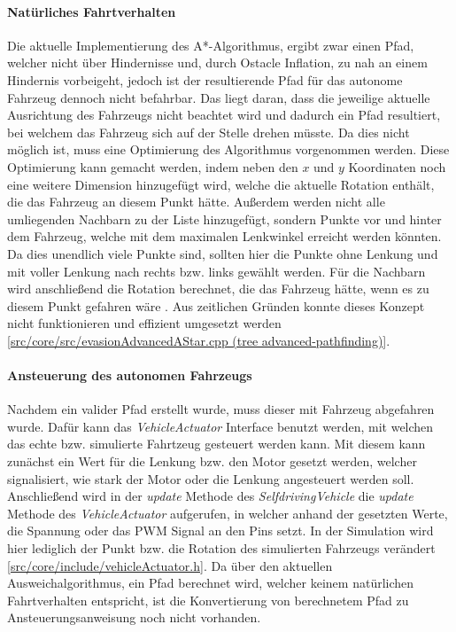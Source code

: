 \paragraph{Natürliches Fahrtverhalten} \mbox{}

Die aktuelle Implementierung des A*-Algorithmus, ergibt zwar einen Pfad, welcher nicht über Hindernisse und, durch Ostacle Inflation, 
zu nah an einem Hindernis vorbeigeht, jedoch ist der resultierende Pfad für das autonome Fahrzeug dennoch nicht befahrbar. 
Das liegt daran, dass die jeweilige aktuelle Ausrichtung des Fahrzeugs nicht beachtet wird und dadurch ein Pfad resultiert, 
bei welchem das Fahrzeug sich auf der Stelle drehen müsste. 
Da dies nicht möglich ist, muss eine Optimierung des Algorithmus vorgenommen werden. 
Diese Optimierung kann gemacht werden, indem neben den \(x\) und \(y\) Koordinaten noch eine weitere Dimension hinzugefügt wird, 
welche die aktuelle Rotation enthält, die das Fahrzeug an diesem Punkt hätte. 
Außerdem werden nicht alle umliegenden Nachbarn zu der Liste hinzugefügt, sondern Punkte vor und hinter dem Fahrzeug, 
welche mit dem maximalen Lenkwinkel erreicht werden könnten. Da dies unendlich viele Punkte sind, 
sollten hier die Punkte ohne Lenkung und mit voller Lenkung nach rechts bzw. links gewählt werden. 
Für die Nachbarn wird anschließend die Rotation berechnet, die das Fahrzeug hätte, 
wenn es zu diesem Punkt gefahren wäre \cite{restricted_pathfindng_2017}. 
Aus zeitlichen Gründen konnte dieses Konzept nicht funktionieren und effizient umgesetzt werden 
[\href{https://github.com/Jundy0/Studienarbeit/blob/advanced-pathfinding/src/core/src/evasionAdvancedAStar.cpp}{src/core/src/evasionAdvancedAStar.cpp (tree advanced-pathfinding)}]. 

\paragraph{Ansteuerung des autonomen Fahrzeugs} \mbox{}

Nachdem ein valider Pfad erstellt wurde, muss dieser mit Fahrzeug abgefahren wurde. 
Dafür kann das \textit{VehicleActuator} Interface benutzt werden, mit welchen das echte bzw. simulierte Fahrtzeug gesteuert werden kann. 
Mit diesem kann zunächst ein Wert für die Lenkung bzw. den Motor gesetzt werden, welcher signalisiert, 
wie stark der Motor oder die Lenkung angesteuert werden soll. 
Anschließend wird in der \textit{update} Methode des \textit{SelfdrivingVehicle} die \textit{update} Methode des \textit{VehicleActuator} aufgerufen, 
in welcher anhand der gesetzten Werte, die Spannung oder das PWM Signal an den Pins setzt. 
In der Simulation wird hier lediglich der Punkt bzw. die Rotation des simulierten Fahrzeugs verändert 
[\href{https://github.com/Jundy0/Studienarbeit/blob/main/src/core/include/vehicleActuator.h}{src/core/include/vehicleActuator.h}]. 
Da über den aktuellen Ausweichalgorithmus, ein Pfad berechnet wird, welcher keinem natürlichen Fahrtverhalten entspricht, 
ist die Konvertierung von berechnetem Pfad zu Ansteuerungsanweisung noch nicht vorhanden. 

\newpage

